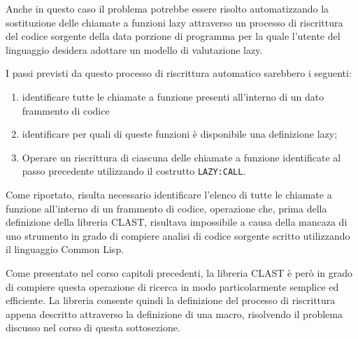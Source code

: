 Anche in questo caso il problema potrebbe essere risolto automatizzando la
sostituzione delle chiamate a funzioni lazy attraverso un processo di
riscrittura del codice sorgente della data porzione di programma per la quale
l'utente del linguaggio desidera adottare un modello di valutazione lazy.

I passi previsti da questo processo di riscrittura automatico sarebbero i
seguenti:

\begin{enumerate}

\item identificare tutte le chiamate a funzione presenti all'interno di un dato
frammento di codice

\item identificare per quali di queste funzioni è disponibile una definizione
lazy;

\item Operare un riscrittura di ciascuna delle chiamate a funzione identificate
al passo precedente utilizzando il costrutto \texttt{LAZY:CALL}.

\end{enumerate}

Come riportato, risulta necessario identificare l'elenco di tutte le chiamate a
funzione all'interno di un frammento di codice, operazione che, prima della
definizione della libreria CLAST, risultava impossibile a causa della mancaza di
uno strumento in grado di compiere analisi di codice sorgente scritto
utilizzando il linguaggio Common Lisp.

Come presentato nel corso capitoli precedenti, la libreria CLAST è però in grado
di compiere questa operazione di ricerca in modo particolarmente semplice ed
efficiente. La libreria consente quindi la definizione del processo di
riscrittura appena descritto attraverso la definizione di una macro, risolvendo
il problema discusso nel corso di questa sottosezione.

